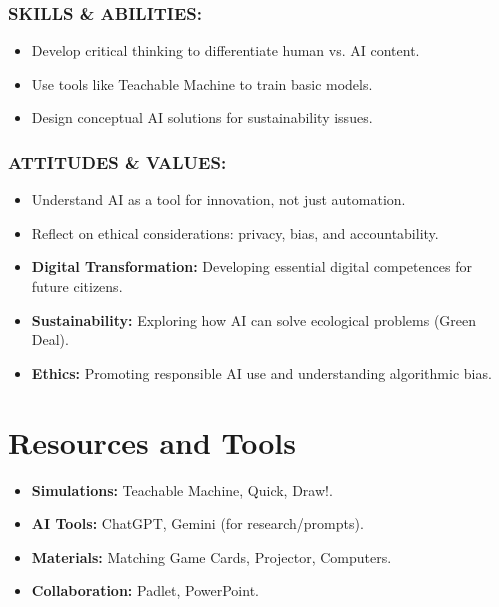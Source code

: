 \documentclass[11pt, a4paper]{article}
\begin{document}
\subsubsection*{SKILLS \& ABILITIES:}
\begin{itemize}
    \item Develop critical thinking to differentiate human vs. AI content.
    \item Use tools like Teachable Machine to train basic models.
    \item Design conceptual AI solutions for sustainability issues.
\end{itemize}

\subsubsection*{ATTITUDES \& VALUES:}
\begin{itemize}
    \item Understand AI as a tool for innovation, not just automation.
    \item Reflect on ethical considerations: privacy, bias, and accountability.
\end{itemize}

\begin{eurobox}
\begin{itemize}
    \item \textbf{Digital Transformation:} Developing essential digital competences for future citizens.
    \item \textbf{Sustainability:} Exploring how AI can solve ecological problems (Green Deal).
    \item \textbf{Ethics:} Promoting responsible AI use and understanding algorithmic bias.
\end{itemize}
\end{eurobox}

\newpage
\section{Resources and Tools}
\begin{itemize}
    \item \textbf{Simulations:} Teachable Machine, Quick, Draw!.
    \item \textbf{AI Tools:} ChatGPT, Gemini (for research/prompts).
    \item \textbf{Materials:} Matching Game Cards, Projector, Computers.
    \item \textbf{Collaboration:} Padlet, PowerPoint.
\end{itemize}
\end{document}
